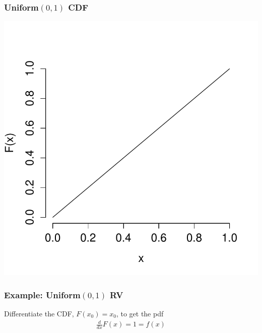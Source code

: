 \documentclass[handout]{beamer}
\begin{document}
\begin{frame}
\frametitle{Uniform$(0,1)$ CDF}
\centering
	\includegraphics[scale = 0.6]{./images/uniform_CDF}

\end{frame}


\begin{frame}
\frametitle{Example: Uniform$(0,1)$ RV}
Differentiate the CDF, $F(x_0) = x_0$, to get the pdf
 \begin{eqnarray*}
	\frac{d}{dx}F(x) =  1 = f(x)
 \end{eqnarray*}
\end{frame}



\end{document}
